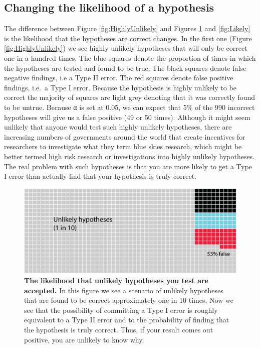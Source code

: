 \documentclass[
]{krantz}
\begin{document}
\hypertarget{changing-the-likelihood-of-a-hypothesis}{%
\subsection{Changing the likelihood of a hypothesis}\label{changing-the-likelihood-of-a-hypothesis}}

The difference between Figure \ref{fig:HighlyUnlikely} and Figures \ref{fig:Unlikely} and \ref{fig:Likely} is the likelihood that the hypotheses are correct changes. In the first one (Figure \ref{fig:HighlyUnlikely}) we see highly unlikely hypotheses that will only be correct one in a hundred times. The blue squares denote the proportion of times in which the hypotheses are tested and found to be true. The black squares denote false negative findings, i.e a Type II error. The red squares denote false positive findings, i.e.~a Type I error. Because the hypothesis is highly unlikely to be correct the majority of squares are light grey denoting that it was correctly found to be untrue. Because α is set at 0.05, we can expect that 5\% of the 990 incorrect hypotheses will give us a false positive (49 or 50 times). Although it might seem unlikely that anyone would test such highly unlikely hypotheses, there are increasing numbers of governments around the world that create incentives for researchers to investigate what they term blue skies research, which might be better termed high risk research or investigations into highly unlikely hypotheses. The real problem with such hypotheses is that you are more likely to get a Type I error than actually find that your hypothesis is truly correct.



\begin{figure}
\includegraphics[width=0.9\linewidth]{figures/Unlikely} \caption{\textbf{The likelihood that unlikely hypotheses you test are accepted.} In this figure we see a scenario of unlikely hypotheses that are found to be correct approximately one in 10 times. Now we see that the possibility of committing a Type I error is roughly equivalent to a Type II error and to the probability of finding that the hypothesis is truly correct. Thus, if your result comes out positive, you are unlikely to know why.}\label{fig:Unlikely}
\end{figure}
\end{document}
